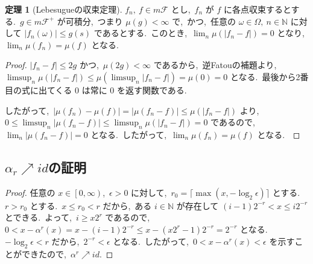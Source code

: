 \documentclass[a4j,11pt]{jarticle}
\theoremstyle{definition}
\newtheorem{theorem}{定理}
\begin{document}
\begin{theorem}[Lebesugueの収束定理]
  $f_n,\ f \in m\mathcal{F}$
  とし,\ 
  $f_n$
  が
  $f$
  に各点収束するとする.\ 
  $g \in m\mathcal{F}^+$
  が可積分,\ 
  つまり
  $\mu(g) < \infty$
  で,\ かつ,\ 任意の
  $\omega \in \Omega,\ n \in \mathbb{N}$
  に対して
  $|f_n(\omega)| \leq g(s)$
  であるとする.\ 
  このとき,\ 
  $\lim_n \mu\left( |f_n - f|\right) = 0$
  となり,\ 
  $\lim_n \mu(f_n) = \mu(f)$
  となる.\ 
\end{theorem}

\begin{proof}
  $|f_n-f| \leq 2g$
  かつ,\ 
  $\mu(2g) < \infty$
  であるから,\ 逆Fatouの補題より,\ 
  $\limsup_n \mu\left( |f_n-f|\right) \leq \mu\left( \limsup_n |f_n - f|\right) = \mu(0) = 0$
  となる.\ 
  最後から2番目の式に出てくる
  $0$
  は常に
  $0$
  を返す関数である.\ 

  したがって,\ 
  $|\mu(f_n) - \mu(f)| = |\mu(f_n - f)| \leq \mu(|f_n - f|)$
  より,\ 
  $0 \leq \limsup_n |\mu(f_n - f)| \leq \limsup_n \mu(|f_n-f|) = 0 $
  であるので,\ 
  $\lim_n |\mu(f_n - f)| = 0$
  となる.\ 
  したがって,\ 
  $\lim_n \mu(f_n) = \mu(f)$
  となる.\ 
\end{proof}

\subsection{$\alpha_r \nearrow id$の証明}\label{subsec:proof}
\begin{proof}
  任意の
  $x\in \left[ 0, \infty \right)$,\ 
  $\epsilon > 0$
  に対して,\ 
  $r_0 = \lceil \max(x, -\log_2 \epsilon) \rceil$
  とする.\ 
  $r > r_0$
  とする.\ 
  $x \leq r_0 < r$
  だから,\ ある
  $i \in \mathbb{N}$
  が存在して
  $(i-1)2^{-r} < x \leq i2^{-r}$
  とできる.\ 
  よって,\ 
  $i \geq x2^r$
  であるので,\ 
  $0 < x - \alpha^r(x) = x - (i-1)2^{-r} \leq x - (x2^r - 1)2^{-r} = 2^{-r}$
  となる.\ 
  $- \log_2 \epsilon < r$
  だから,\ 
  $2^{-r} < \epsilon$
  となる.\ 
  したがって,\ 
  $0 < x- \alpha^r(x) < \epsilon$
  を示すことができたので,\ 
  $\alpha^r \nearrow id$.
\end{proof}
%
%
\end{document}
